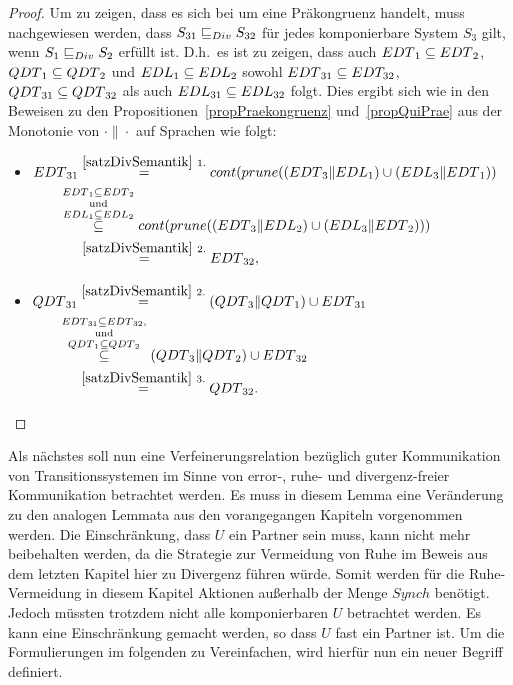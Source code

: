\begin{proof}
  Um zu zeigen, dass es sich bei \DRel{} um eine Präkongruenz handelt, muss
  nachgewiesen werden, dass $S_{31}\sqsubseteq _{Div}{} S_{32}$ für jedes komponierbare
  System $S_3$ gilt, wenn $S_1\sqsubseteq _{Div}{} S_2$ erfüllt ist.  D.h.\ es ist
  zu zeigen, dass auch $EDT{}_1\subseteq EDT{}_2$, $QDT{}_1\subseteq
  QDT{}_2$ und $EDL{}_1\subseteq EDL{}_2$ sowohl $EDT{}_{31}\subseteq
  EDT_{32}$, $QDT{}_{31}\subseteq QDT{}_{32}$ als auch $EDL{}_{31}\subseteq
  EDL{}_{32}$ folgt. Dies ergibt sich wie in den Beweisen zu den
  Propositionen~\ref{propPraekongruenz} und~\ref{propQuiPrae} aus der Monotonie
  von $\cdot\|\cdot$ auf Sprachen wie folgt:
  \begin{itemize}
    \item $\begin{aligned}[t]
        \EDT{}_{31} &\overset{\ref{satzDivSemantik}~1.}{=}
        \cont{}(\prune{}((\EDT{}_3\|\EDL{}_1) \cup (\EDL{}_3\|\EDT{}_1))\\
        &\hspace{-0.5cm}\overset{\EDT{}_1\subseteq
      \EDT{}_2}{\overset{\mathrm{und}}{\overset{\EDL{}_1\subseteq
    \EDL{}_2}{\subseteq}}} \cont{}(\prune{}((\EDT{}_3\|\EDL{}_2) \cup
    (\EDL{}_3\|\EDT{}_2)))\\
      &\overset{\ref{satzDivSemantik}~2.}{=} \EDT{}_{32},
    \end{aligned}$
    \item $\begin{aligned}[t]
        \QDT{}_{31} &\overset{\ref{satzDivSemantik}~2.}{=} (\QDT{}_3\|\QDT{}_1)
        \cup \EDT{}_{31}\\
        &\hspace{-0.5cm}\overset{\EDT{}_{31}\subseteq
      \EDT{}_{32},}{\overset{\mathrm{und}}{\overset{\QDT{}_1\subseteq
      \QDT{}_2}{\subseteq}}} (\QDT{}_3\|\QDT{}_2) \cup \EDT{}_{32}\\
      &\overset{\ref{satzDivSemantik}~3.}{=} \QDT{}_{32}.
    \end{aligned}$
  \end{itemize}
\end{proof}

Als nächstes soll nun eine Verfeinerungsrelation bezüglich guter Kommunikation
von Transitionssystemen im Sinne von error-, ruhe- und divergenz-freier
Kommunikation betrachtet werden. Es muss in diesem Lemma eine Veränderung zu
den analogen Lemmata aus den vorangegangen Kapiteln vorgenommen werden. Die
Einschränkung, dass $U$ ein Partner sein muss, kann nicht mehr beibehalten
werden, da die Strategie zur Vermeidung von Ruhe im Beweis aus dem letzten
Kapitel hier zu Divergenz führen würde. Somit werden für die Ruhe-Vermeidung in
diesem Kapitel Aktionen außerhalb der Menge $Synch$
benötigt. Jedoch müssten trotzdem nicht alle komponierbaren $U$ betrachtet
werden. Es kann eine Einschränkung gemacht werden, so dass $U$ fast ein
Partner ist. Um die Formulierungen im folgenden zu Vereinfachen, wird hierfür
nun ein neuer Begriff definiert.

